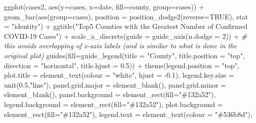 \documentclass[
  12pt,
]{style/krantz}
\newenvironment{Shaded}{\begin{snugshade}}{\end{snugshade}}
\newcommand{\AttributeTok}[1]{\textcolor[rgb]{0.77,0.63,0.00}{#1}}
\newcommand{\CommentTok}[1]{\textcolor[rgb]{0.56,0.35,0.01}{\textit{#1}}}
\newcommand{\ConstantTok}[1]{\textcolor[rgb]{0.00,0.00,0.00}{#1}}
\newcommand{\DecValTok}[1]{\textcolor[rgb]{0.00,0.00,0.81}{#1}}
\newcommand{\FloatTok}[1]{\textcolor[rgb]{0.00,0.00,0.81}{#1}}
\newcommand{\FunctionTok}[1]{\textcolor[rgb]{0.00,0.00,0.00}{#1}}
\newcommand{\NormalTok}[1]{#1}
\newcommand{\SpecialCharTok}[1]{\textcolor[rgb]{0.00,0.00,0.00}{#1}}
\newcommand{\StringTok}[1]{\textcolor[rgb]{0.31,0.60,0.02}{#1}}
\begin{document}
\begin{Shaded}
\begin{Highlighting}[]
\FunctionTok{ggplot}\NormalTok{(cases2, }\FunctionTok{aes}\NormalTok{(}\AttributeTok{y=}\NormalTok{cases, }\AttributeTok{x=}\NormalTok{date, }\AttributeTok{fill=}\NormalTok{county, }\AttributeTok{group=}\NormalTok{cases)) }\SpecialCharTok{+}
  \FunctionTok{geom\_bar}\NormalTok{(}\FunctionTok{aes}\NormalTok{(}\AttributeTok{group=}\NormalTok{cases), }\AttributeTok{position =} \FunctionTok{position\_dodge2}\NormalTok{(}\AttributeTok{reverse=}\ConstantTok{TRUE}\NormalTok{), }\AttributeTok{stat =} \StringTok{"identity"}\NormalTok{) }\SpecialCharTok{+}
  \FunctionTok{ggtitle}\NormalTok{(}\StringTok{"Top5 Counties with the Greatest Number of Confirmed COVID{-}19 Cases"}\NormalTok{) }\SpecialCharTok{+}
  \FunctionTok{scale\_x\_discrete}\NormalTok{(}\AttributeTok{guide =} \FunctionTok{guide\_axis}\NormalTok{(}\AttributeTok{n.dodge =} \DecValTok{2}\NormalTok{)) }\SpecialCharTok{+}  \CommentTok{\# this avoids overlapping of x{-}axis labels (and is similar to what is done in the original plot)}
  \FunctionTok{guides}\NormalTok{(}\AttributeTok{fill=}\FunctionTok{guide\_legend}\NormalTok{(}\AttributeTok{title =} \StringTok{"County"}\NormalTok{,}
                           \AttributeTok{title.position =} \StringTok{"top"}\NormalTok{,}
                           \AttributeTok{direction =} \StringTok{"horizontal"}\NormalTok{,}
                           \AttributeTok{title.hjust =} \FloatTok{0.5}\NormalTok{)) }\SpecialCharTok{+}
  \FunctionTok{theme}\NormalTok{(}\AttributeTok{legend.position =} \StringTok{"top"}\NormalTok{,}
        \AttributeTok{plot.title =} \FunctionTok{element\_text}\NormalTok{(}\AttributeTok{colour =} \StringTok{"white"}\NormalTok{, }\AttributeTok{hjust =} \SpecialCharTok{{-}}\FloatTok{0.1}\NormalTok{),}
        \AttributeTok{legend.key.size =} \FunctionTok{unit}\NormalTok{(}\FloatTok{0.5}\NormalTok{,}\StringTok{"line"}\NormalTok{),}
        \AttributeTok{panel.grid.major =} \FunctionTok{element\_blank}\NormalTok{(),}
        \AttributeTok{panel.grid.minor =} \FunctionTok{element\_blank}\NormalTok{(),        }
        \AttributeTok{panel.background =} \FunctionTok{element\_rect}\NormalTok{(}\AttributeTok{fill=}\StringTok{"\#132a52"}\NormalTok{),}
        \AttributeTok{legend.background =} \FunctionTok{element\_rect}\NormalTok{(}\AttributeTok{fill=}\StringTok{"\#132a52"}\NormalTok{),}
        \AttributeTok{plot.background =} \FunctionTok{element\_rect}\NormalTok{(}\AttributeTok{fill=}\StringTok{"\#132a52"}\NormalTok{),}
        \AttributeTok{legend.text =} \FunctionTok{element\_text}\NormalTok{(}\AttributeTok{colour =} \StringTok{"\#536b8d"}\NormalTok{), }

\end{Highlighting}
\end{Shaded}
\end{document}

